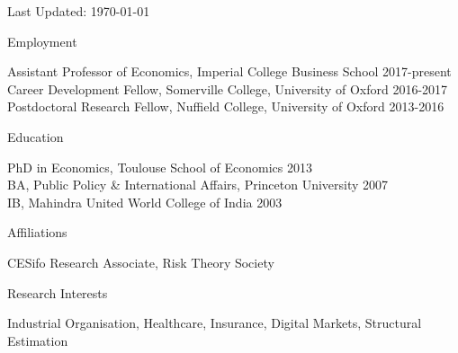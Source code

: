 \documentclass{resume}
\begin{document}
\begin{center}
\scriptsize{Last Updated: \today}	
\end{center}





\begin{rSection}{Employment}

Assistant Professor of Economics, Imperial College Business School \hfill {2017-present} 
\\ Career Development Fellow, Somerville College, University of Oxford \hfill {2016-2017} 
\\ Postdoctoral Research Fellow, Nuffield College, University of Oxford \hfill {2013-2016} 	
	
\end{rSection}











\begin{rSection}{Education}

PhD in Economics, Toulouse School of Economics \hfill {2013} 
\\ BA, Public Policy \& International Affairs, Princeton University \hfill {2007}
\\ IB, Mahindra United World College of India \hfill{2003}

\end{rSection}








\begin{rSection}{Affiliations}

CESifo Research Associate, Risk Theory Society  
	
\end{rSection}









\begin{rSection}{Research Interests}

Industrial Organisation, Healthcare, Insurance, Digital Markets, Structural Estimation
	
\end{rSection}
\end{document}
